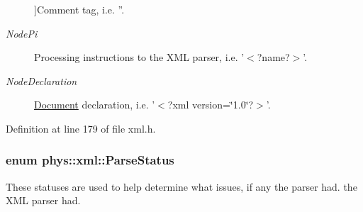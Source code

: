 \begin{Desc}
\begin{description}
{}]Comment tag, i.e. ''. \item[{\em 
\hypertarget{namespacephys_1_1xml_a668b0cc666a9d49f7c7222a7552115d3a3c09d11be0cea840f23f55e084cf72fa}{
NodePi}
\label{d9/d27/namespacephys_1_1xml_a668b0cc666a9d49f7c7222a7552115d3a3c09d11be0cea840f23f55e084cf72fa}
}]Processing instructions to the XML parser, i.e. '$<$?name?$>$'. \item[{\em 
\hypertarget{namespacephys_1_1xml_a668b0cc666a9d49f7c7222a7552115d3a1e3789aa995b7bf563ca8c43553ac035}{
NodeDeclaration}
\label{d9/d27/namespacephys_1_1xml_a668b0cc666a9d49f7c7222a7552115d3a1e3789aa995b7bf563ca8c43553ac035}
}]\hyperlink{classphys_1_1xml_1_1Document}{Document} declaration, i.e. '$<$?xml version=\char`\"{}1.0\char`\"{}?$>$'. \end{description}
\end{Desc}



Definition at line 179 of file xml.h.

\hypertarget{namespacephys_1_1xml_ae7aabb879b21c73d8183a54470f8917f}{
\subsubsection[{ParseStatus}]{\setlength{\rightskip}{0pt plus 5cm}enum {\bf phys::xml::ParseStatus}}}
\label{d9/d27/namespacephys_1_1xml_ae7aabb879b21c73d8183a54470f8917f}


These statuses are used to help determine what issues, if any the parser had. the XML parser had. 

